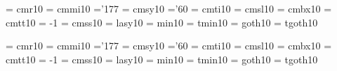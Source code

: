  \font\tenrm  = cmr10    %
 \font\tenmi  = cmmi10   %
    \skewchar\tenmi ='177  %
 \font\tensy  = cmsy10   %
    \skewchar\tensy ='60 %
 \font\tenit  = cmti10   %
 \font\tensl  = cmsl10   %
 \font\tenbf  = cmbx10   %
 \font\tentt  = cmtt10   %
    \hyphenchar\tentt = -1         %
 \font\tensf  = cmss10   %
 \font\tenly  = lasy10   %
\font\tenmin  = min10    %
\font\tentmin = tmin10   %
\font\tengt   = goth10   %
\font\tentgt  = tgoth10  %
  

 \font\elvrm  = cmr10    \@halfmag %
 \font\elvmi  = cmmi10   \@halfmag %
    \skewchar\elvmi ='177          %
 \font\elvsy  = cmsy10   \@halfmag %
    \skewchar\elvsy ='60           %
 \font\elvit  = cmti10   \@halfmag %
 \font\elvsl  = cmsl10   \@halfmag %
 \font\elvbf  = cmbx10   \@halfmag %
 \font\elvtt  = cmtt10   \@halfmag %
    \hyphenchar\elvtt = -1         %
 \font\elvsf  = cmss10   \@halfmag %
 \font\elvly  = lasy10  \@halfmag %
\font\elvmin  = min10    \@halfmag %
\font\elvtmin = tmin10   \@halfmag %
\font\elvgt   = goth10   \@halfmag %
\font\elvtgt  = tgoth10  \@halfmag %
  

